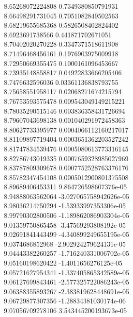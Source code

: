 {8.65268072224808 0.7349380850791931 \\
8.66498291731045 0.7051082849502563 \\
8.68219655685368 0.5826508402824402 \\
8.6923691738566 0.441871702671051 \\
8.70402020270228 0.3347371518611908 \\
8.71496468456161 0.1976903975009918 \\
8.72950669355475 0.1000161096453667 \\
8.73935148858817 0.04922833666205406 \\
8.7476632596036 0.03361136838793755 \\
8.75658551958117 0.02068271674215794 \\
8.76753593575478 0.009543049149215221 \\
8.78035290515146 0.003836358431726694 \\
8.79607043698138 0.001040291972458363 \\
8.80627733395977 0.0004066112160217017 \\
8.81109897719404 0.0003651362203527242 \\
8.81747834539476 0.0005080613773316145 \\
8.82786743019335 0.0007659328985027969 \\
8.83787809309678 0.0007752528763376176 \\
8.85782347454108 0.0005012900801375508 \\
8.89689406453311 9.864726598607376e-05 \\
8.94888063562064 -3.027065758942626e-05 \\
8.98036214750294 -1.53933997353306e-05 \\
8.99790302800506 -1.189862086903304e-05 \\
9.01359750865458 -3.47569293808192e-05 \\
9.02691841443499 -4.340899249655195e-05 \\
9.0374686852968 -2.902924279624131e-05 \\
9.04443382260257 -1.716240331006702e-05 \\
9.05160198620422 -1.4011656276125e-05 \\
9.05721627954341 -1.337405865342589e-05 \\
9.06127699843461 -2.577325722086243e-05 \\
9.06388355893267 -2.383819628448691e-05 \\
9.06729877307356 -1.28834381030174e-06 \\
9.07056709278106 3.543445200193673e-05 \\
}
